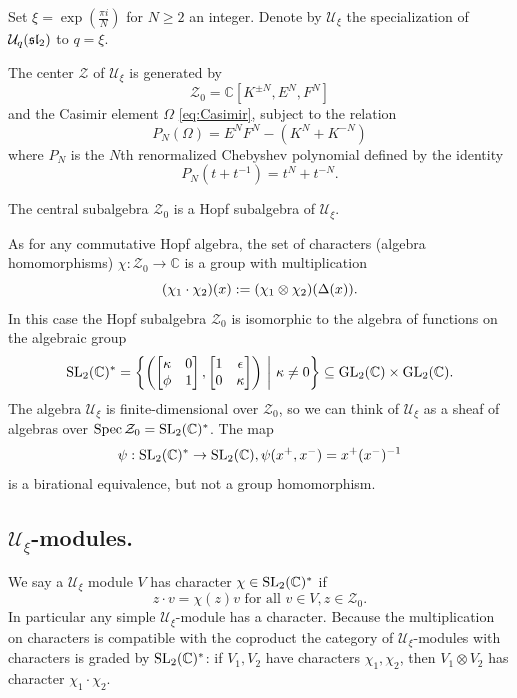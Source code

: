 \documentclass{sl2ams}
\numberwithin{equation}{section}
\newcommand{\CC}{\mathbb{C}}
\newcommand{\Z}{\mathcal{Z}}
\newcommand{\U}{\mathcal{U}}
\begin{document}
Set $\xi=\exp(\frac{\pi i}{N})$ for \(N \ge 2\) an integer.%
Denote by $\U_\xi$ the specialization of $\U_q(\sla)$ to $q=\xi$.
\begin{proposition}
  \label{thm:qgrp-center}
  \begin{thmenum}
    \item
    The center \(\Z\) of $\U_\xi$ is generated by
    \[
      \Z_0 = \CC[K^{\pm N}, E^N, F^N]
    \]
    and the Casimir element $\Omega$ \cref{eq:Casimir}, subject to the relation
    \[
      P_N(\Omega) = E^N F^N - (K^N + K^{-N}) 
    \]
    where $P_N$ is the $N$th renormalized Chebyshev polynomial defined by the identity
    \[
      P_N(t + t^{-1}) = t^N+ t^{-N}.
    \]
    \item
      The central subalgebra \(\Z_0\) is a Hopf subalgebra of  \(\U_\xi\).
  \end{thmenum}
\end{proposition}
As for any commutative Hopf algebra, the set of characters (algebra homomorphisms) \(\chi : \Z_0 \to \mathbb{C}\) is a group with multiplication
\[
  (\chi_1 \cdot \chi_2)(x) \mathrel{:=} (\chi_1 \otimes \chi_2)(\Delta(x)).
\]
In this case the Hopf subalgebra $\Z_0$ is isomorphic to the algebra of functions on the algebraic group
\[
  \slg^*
  =
  \set{
    \left(
      \begin{bmatrix}
        \kappa & 0 \\
        \phi & 1
      \end{bmatrix}
      ,
      \begin{bmatrix}
        1 & \epsilon \\
        0 & \kappa
      \end{bmatrix}
    \right) 
    \given
    \kappa \ne 0
  }
  \subseteq
  \operatorname{GL}_2(\mathbb{C})
  \times
  \operatorname{GL}_2(\mathbb{C}).
\]
The algebra \(\U_\xi\) is finite-dimensional over \(\Z_0\), so we can think of \(\U_\xi\) as a sheaf of algebras over \(\operatorname{Spec} \Z_0 = \slg^*\).
The map
\[
  \psi : \operatorname{SL}_2(\mathbb{C})^* \to \operatorname{SL}_2(\mathbb{C}), \psi(x^+, x^-) = x^+ (x^-)^{-1}
\]
is a birational equivalence, but not a group homomorphism.

\subsection{\texorpdfstring{$\U_\xi$}{Uξ}-modules.}

We say a \(\U_\xi\) module \(V\) has character \(\chi \in \operatorname{SL}_2(\mathbb{C})^*\) if
\[
  z \cdot v = \chi(z) v \text{ for all } v \in V, z \in \Z_0.
\]
In particular any simple \(\U_\xi\)-module has a character.
Because the multiplication on characters is compatible with the coproduct the category of \(\U_\xi\)-modules with characters is graded by \(\operatorname{SL}_2(\mathbb{C})^*\): if \(V_1, V_2\) have characters \(\chi_1, \chi_2\), then \(V_1 \otimes V_2\) has character \(\chi_1 \cdot \chi_2\). 
\end{document}
